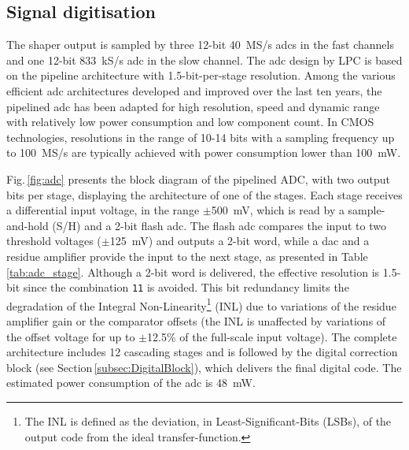 \subsection{Signal digitisation}
\label{subsec:ADC}

The shaper output is sampled by three 12-bit \SI{40}{MS/s} \glspl{adc} in the fast channels and one 12-bit \SI{833}{kS/s} 
\gls{adc} in the slow channel. The \gls{adc} design by LPC is based on the pipeline architecture
with 1.5-bit-per-stage resolution.
Among the various efficient \gls{adc} architectures developed and improved over the last ten years, the pipelined \gls{adc} 
has been adapted for high resolution, speed and dynamic range with relatively low power consumption and low component count. 
In CMOS technologies, resolutions in the range of 10-14 bits with a sampling frequency up to \SI{100}{MS/s} are typically 
achieved with power consumption lower than \SI{100}{mW}.

Fig.\,\ref{fig:adc} presents the block diagram of the pipelined ADC, with two output bits per stage, displaying the architecture
of one of the stages. Each stage receives a differential input voltage, in the range $\pm$\SI{500}{mV}, which is read by a 
sample-and-hold (S/H) and a 2-bit flash \gls{adc}. The flash \gls{adc} compares the input to two threshold voltages ($\pm$\SI{125}{mV}) 
and outputs a 2-bit word, while a \gls{dac} and a residue amplifier provide the input to the next stage, as presented in 
Table\,\ref{tab:adc_stage}. Although a 2-bit word is delivered, the effective resolution is 1.5-bit since the combination \texttt{11} is 
avoided. This bit redundancy limits the degradation of the Integral Non-Linearity\footnote{
The INL is defined as the deviation, in Least-Significant-Bits (LSBs), of the output code from the ideal transfer-function.}
(INL) due to variations of the residue amplifier gain or the comparator offsets (the INL is unaffected by variations of the offset 
voltage for up to $\pm$12.5\% of the full-scale input voltage). The complete architecture includes 12 cascading stages and is 
followed by the digital correction block (see Section\,\ref{subsec:DigitalBlock}), which delivers the final digital code. The 
estimated power consumption of the \gls{adc} is \SI{48}{mW}.

